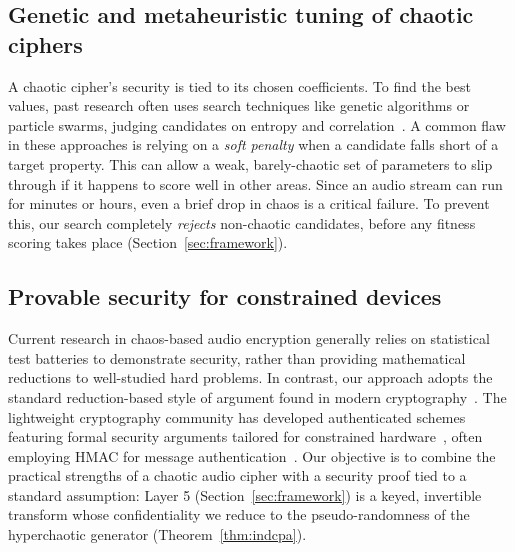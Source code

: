 \documentclass[pdflatex,sn-mathphys-num]{sn-jnl}%
\theoremstyle{thmstyleone}%
\theoremstyle{thmstyletwo}%
\theoremstyle{thmstylethree}%
\begin{document}
\subsection{Genetic and metaheuristic tuning of chaotic ciphers}
A chaotic cipher's security is tied to its chosen coefficients. To find the best values, past research often uses search techniques like genetic algorithms or particle swarms, judging candidates on entropy and correlation~\cite{wang2019,kaur2020}. A common flaw in these approaches is relying on a \emph{soft penalty} when a candidate falls short of a target property. This can allow a weak, barely-chaotic set of parameters to slip through if it happens to score well in other areas. Since an audio stream can run for minutes or hours, even a brief drop in chaos is a critical failure. To prevent this, our search completely \emph{rejects} non-chaotic candidates, before any fitness scoring  takes place (Section~\ref{sec:framework}).

\subsection{Provable security for constrained devices}
Current research in chaos-based audio encryption generally relies on statistical test batteries to demonstrate security, rather than providing mathematical reductions to well-studied hard problems. In contrast, our approach adopts the standard reduction-based style of argument found in modern cryptography~\cite{katz2014,goldreich2001,bellare1997}. The lightweight cryptography community has developed authenticated schemes featuring formal security arguments tailored for constrained hardware~\cite{dworkin2007,bernstein2008,mcgrew2004,bergmann2017}, often employing HMAC for message authentication~\cite{krawczyk1997}. Our objective is to combine the practical strengths of a chaotic audio cipher with a security proof tied to a standard assumption: Layer 5 (Section~\ref{sec:framework}) is a keyed, invertible transform whose confidentiality we reduce to the pseudo-randomness of the hyperchaotic generator (Theorem~\ref{thm:indcpa}).
\end{document}
